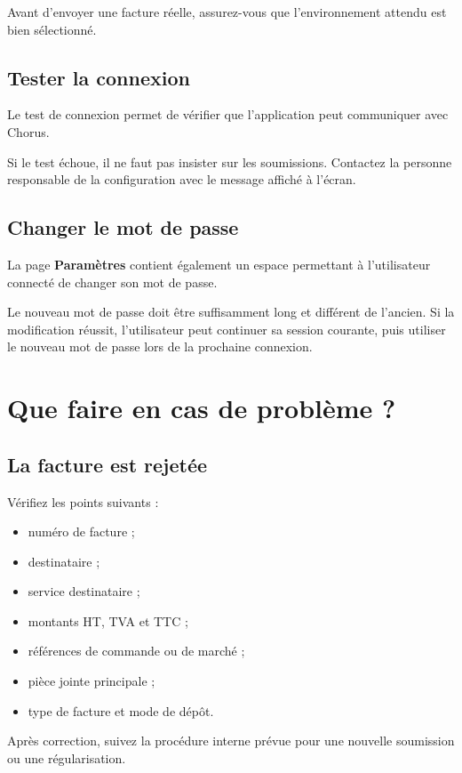 \documentclass[11pt,a4paper]{article}
\begin{document}
Avant d'envoyer une facture réelle, assurez-vous que l'environnement attendu est
bien sélectionné.

\subsection{Tester la connexion}

Le test de connexion permet de vérifier que l'application peut communiquer avec
Chorus.

Si le test échoue, il ne faut pas insister sur les soumissions. Contactez la
personne responsable de la configuration avec le message affiché à l'écran.

\subsection{Changer le mot de passe}

La page \textbf{Paramètres} contient également un espace permettant à
l'utilisateur connecté de changer son mot de passe.

Le nouveau mot de passe doit être suffisamment long et différent de l'ancien. Si
la modification réussit, l'utilisateur peut continuer sa session courante, puis
utiliser le nouveau mot de passe lors de la prochaine connexion.

\section{Que faire en cas de problème ?}

\subsection{La facture est rejetée}

Vérifiez les points suivants :

\begin{itemize}
  \item numéro de facture ;
  \item destinataire ;
  \item service destinataire ;
  \item montants HT, TVA et TTC ;
  \item références de commande ou de marché ;
  \item pièce jointe principale ;
  \item type de facture et mode de dépôt.
\end{itemize}

Après correction, suivez la procédure interne prévue pour une nouvelle soumission
ou une régularisation.
\end{document}
